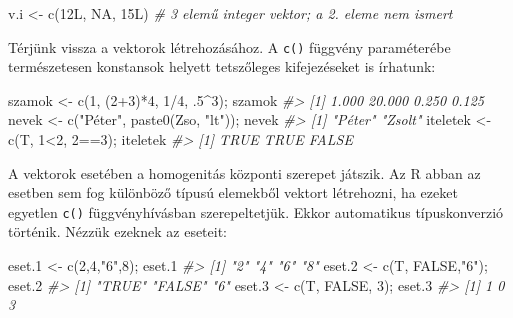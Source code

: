 \documentclass[
]{book}
\newenvironment{Shaded}{\begin{snugshade}}{\end{snugshade}}
\newcommand{\CommentTok}[1]{\textcolor[rgb]{0.56,0.35,0.01}{\textit{#1}}}
\newcommand{\ConstantTok}[1]{\textcolor[rgb]{0.00,0.00,0.00}{#1}}
\newcommand{\DecValTok}[1]{\textcolor[rgb]{0.00,0.00,0.81}{#1}}
\newcommand{\FloatTok}[1]{\textcolor[rgb]{0.00,0.00,0.81}{#1}}
\newcommand{\FunctionTok}[1]{\textcolor[rgb]{0.00,0.00,0.00}{#1}}
\newcommand{\NormalTok}[1]{#1}
\newcommand{\OtherTok}[1]{\textcolor[rgb]{0.56,0.35,0.01}{#1}}
\newcommand{\SpecialCharTok}[1]{\textcolor[rgb]{0.00,0.00,0.00}{#1}}
\newcommand{\StringTok}[1]{\textcolor[rgb]{0.31,0.60,0.02}{#1}}
\begin{document}
\begin{Shaded}
\begin{Highlighting}[]
\NormalTok{v.i }\OtherTok{\textless{}{-}} \FunctionTok{c}\NormalTok{(12L, }\ConstantTok{NA}\NormalTok{, 15L)  }\CommentTok{\# 3 elemű integer vektor; a 2. eleme nem ismert}
\end{Highlighting}
\end{Shaded}

Térjünk vissza a vektorok létrehozásához. A \texttt{c()} függvény paraméterébe természetesen konstansok helyett tetszőleges kifejezéseket is írhatunk:

\begin{Shaded}
\begin{Highlighting}[]
\NormalTok{szamok }\OtherTok{\textless{}{-}} \FunctionTok{c}\NormalTok{(}\DecValTok{1}\NormalTok{, (}\DecValTok{2}\SpecialCharTok{+}\DecValTok{3}\NormalTok{)}\SpecialCharTok{*}\DecValTok{4}\NormalTok{, }\DecValTok{1}\SpecialCharTok{/}\DecValTok{4}\NormalTok{, .}\DecValTok{5}\SpecialCharTok{\^{}}\DecValTok{3}\NormalTok{);        szamok}
\CommentTok{\#\textgreater{} [1]  1.000 20.000  0.250  0.125}
\NormalTok{nevek  }\OtherTok{\textless{}{-}} \FunctionTok{c}\NormalTok{(}\StringTok{"Péter"}\NormalTok{, }\FunctionTok{paste0}\NormalTok{(}\StringTok{\textquotesingle{}Zso\textquotesingle{}}\NormalTok{, }\StringTok{"lt"}\NormalTok{)); nevek}
\CommentTok{\#\textgreater{} [1] "Péter" "Zsolt"}
\NormalTok{iteletek }\OtherTok{\textless{}{-}} \FunctionTok{c}\NormalTok{(T, }\DecValTok{1}\SpecialCharTok{\textless{}}\DecValTok{2}\NormalTok{, }\DecValTok{2}\SpecialCharTok{==}\DecValTok{3}\NormalTok{);               iteletek}
\CommentTok{\#\textgreater{} [1]  TRUE  TRUE FALSE}
\end{Highlighting}
\end{Shaded}

A vektorok esetében a homogenitás központi szerepet játszik. Az R abban az esetben sem fog különböző típusú elemekből vektort létrehozni, ha ezeket egyetlen \texttt{c()} függvényhívásban szerepeltetjük. Ekkor automatikus típuskonverzió történik. Nézzük ezeknek az eseteit:

\begin{Shaded}
\begin{Highlighting}[]
\NormalTok{eset}\FloatTok{.1} \OtherTok{\textless{}{-}} \FunctionTok{c}\NormalTok{(}\DecValTok{2}\NormalTok{,}\DecValTok{4}\NormalTok{,}\StringTok{"6"}\NormalTok{,}\DecValTok{8}\NormalTok{);    eset}\FloatTok{.1}
\CommentTok{\#\textgreater{} [1] "2" "4" "6" "8"}
\NormalTok{eset}\FloatTok{.2} \OtherTok{\textless{}{-}} \FunctionTok{c}\NormalTok{(T, }\ConstantTok{FALSE}\NormalTok{,}\StringTok{"6"}\NormalTok{); eset}\FloatTok{.2}
\CommentTok{\#\textgreater{} [1] "TRUE"  "FALSE" "6"}
\NormalTok{eset}\FloatTok{.3} \OtherTok{\textless{}{-}} \FunctionTok{c}\NormalTok{(T, }\ConstantTok{FALSE}\NormalTok{, }\DecValTok{3}\NormalTok{);  eset}\FloatTok{.3}
\CommentTok{\#\textgreater{} [1] 1 0 3}
\end{Highlighting}
\end{Shaded}
\end{document}
